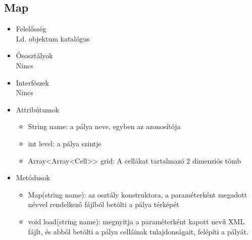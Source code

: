 \subsection{Map}
\begin{itemize}
\item Felelősség\\
Ld. objektum katalógus
\item Ősosztályok\\
Nincs
\item Interfészek\\
Nincs
\item Attribútumok
	\begin{itemize}
		\item String name: a pálya neve, egyben az azonosítója
		\item int level: a pálya szintje
		\item Array<Array<Cell>> grid: A cellákat tartalmazó 2 dimenziós tömb

		
	\end{itemize}
\item Metódusok
	\begin{itemize}
		
		\item Map(string name): az osztály konstruktora, a paraméterként megadott névvel rendelkező fájlból betölti a pálya térképét
		\item void load(string name): megnyitja a paraméterként kapott nevű XML fájlt, és abból betölti a pálya celláinak tulajdonságait, felépíti a pályát.
		
		
	\end{itemize}
\end{itemize}
